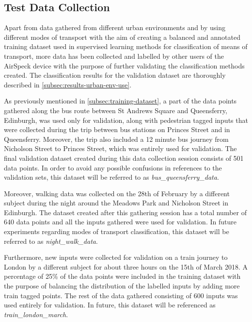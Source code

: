 \documentclass[bsc,frontabs,twoside,singlespacing, parskip,deptreport]{infthesis}     %
\begin{document}
\subsection{Test Data Collection}
\label{subsec:test-data-collection}

Apart from data gathered from different urban environments and by using different modes of transport with the aim of creating a balanced and annotated training dataset used in supervised learning methods for classification of means of transport, more data has been collected and labelled by other users of the AirSpeck device with the purpose of further validating the classification methods created. The classification results for the validation dataset are thoroughly described in \ref{subsec:results-urban-env-use}.

As previously mentioned in \ref{subsec:training-dataset}, a part of the data points gathered along the bus route between St Andrews Square and Queensferry, Edinburgh, was used only for validation, along with pedestrian tagged inputs that were collected during the trip between bus stations on Princes Street and in Queensferry. Moreover, the trip also included a 12 minute bus journey from Nicholson Street to Princes Street, which was entirely used for validation. The final validation dataset created during this data collection session consists of 501 data points. In order to avoid any possible confusions in references to the validation sets, this dataset will be referred to as \textit{bus\_queensferry\_data}.

Moreover, walking data was collected on the 28th of February by a different subject during the night around the Meadows Park and Nicholson Street in Edinburgh. The dataset created after this gathering session has a total number of 640 data points and all the inputs gathered were used for validation. In future experiments regarding modes of transport classification, this dataset will be referred to as \textit{night\_walk\_data}.

Furthermore, new inputs were collected for validation on a train journey to London by a different subject for about three hours on the 15th of March 2018. A percentage of 25\% of the data points were included in the training dataset with the purpose of balancing the distribution of the labelled inputs by adding more train tagged points. The rest of the data gathered consisting of 600 inputs was used entirely for validation. In future, this dataset will be referenced as \textit{train\_london\_march}.
\end{document}
